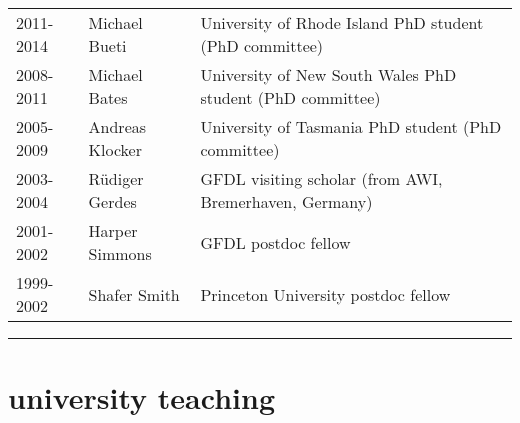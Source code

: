 \documentclass{article}
\begin{document}
\begin{tabular}{lll}
2011-2014     & Michael Bueti       & University of Rhode Island  PhD student (PhD committee) \\

2008-2011     & Michael Bates       & University of New South Wales PhD student (PhD committee) \\

2005-2009     & Andreas Klocker   & University of Tasmania  PhD student (PhD committee) \\

2003-2004     & {R\"{u}diger} Gerdes  & GFDL visiting scholar (from AWI, Bremerhaven, Germany) \\

2001-2002     & Harper Simmons   & GFDL postdoc fellow \\

1999-2002     & Shafer Smith         & Princeton University postdoc fellow    
\end{tabular}

\noindent\rule{\textwidth}{1pt}
\vspace{-1cm}
\section*{\sc  \color{Maroon}  university teaching}
\vspace{-.3cm}
\end{document}
